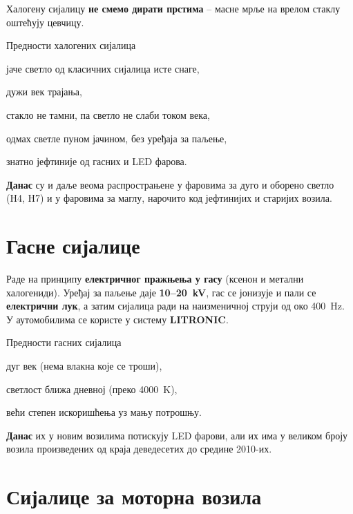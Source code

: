 \documentclass{report}
\begin{document}
\begin{kljucno}
Халогену сијалицу \textbf{не смемо дирати прстима} -- масне мрље на врелом
стаклу оштећују цевчицу.
\end{kljucno}

\begin{podela}{Предности халогених сијалица}
\begin{lista}
    \item јаче светло од класичних сијалица исте снаге,
    \item дужи век трајања,
    \item стакло не тамни, па светло не слаби током века,
    \item одмах светле пуном јачином, без уређаја за паљење,
    \item знатно јефтиније од гасних и LED фарова.
\end{lista}
\end{podela}

\textbf{Данас} су и даље веома распрострањене у фаровима за дуго и оборено
светло (H4, H7) и у фаровима за маглу, нарочито код јефтинијих и старијих
возила.

\section{Гасне сијалице}

Раде на принципу \textbf{електричног пражњења у гасу} (ксенон и метални
халогениди). Уређај за паљење даје \textbf{10--20~kV}, гас се јонизује и пали
се \textbf{електрични лук}, а затим сијалица ради на наизменичној струји од
око 400~Hz. У аутомобилима се користе у систему \textbf{LITRONIC}.

\begin{podela}{Предности гасних сијалица}
\begin{lista}
    \item дуг век (нема влакна које се троши),
    \item светлост ближа дневној (преко 4000~K),
    \item већи степен искоришћења уз мању потрошњу.
\end{lista}
\end{podela}

\textbf{Данас} их у новим возилима потискују LED фарови, али их има у великом
броју возила произведених од краја деведесетих до средине 2010-их.

\section{Сијалице за моторна возила}
\end{document}
